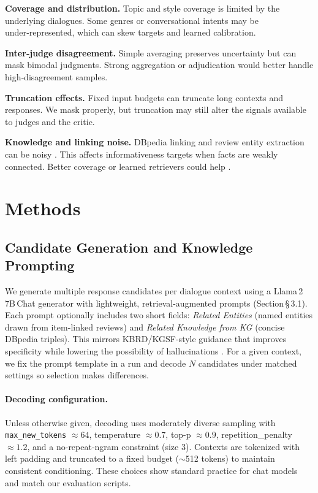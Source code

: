 \documentclass[12pt]{article}
\begin{document}
  \textbf{Coverage and distribution.} Topic and style coverage is limited by the underlying dialogues. Some genres or conversational intents may be under‑represented, which can skew targets and learned calibration.

  \textbf{Inter‑judge disagreement.} Simple averaging preserves uncertainty but can mask bimodal judgments. Strong aggregation or adjudication would better handle high‑disagreement samples.

  \textbf{Truncation effects.} Fixed input budgets can truncate long contexts and responses. We mask properly, but truncation may still alter the signals available to judges and the critic.

  \textbf{Knowledge and linking noise.} DBpedia linking and review entity extraction can be noisy \citep{dbpedia_wikipedia}. This affects informativeness targets when facts are weakly connected. Better coverage or learned retrievers could help \citep{lewis2020rag}.
  
  \section{Methods}
  \subsection{Candidate Generation and Knowledge Prompting}
  We generate multiple response candidates per dialogue context using a Llama\,2\,\textendash\,7B\,Chat generator with lightweight, retrieval-augmented prompts (Section\,\S\,3.1). Each prompt optionally includes two short fields: \emph{Related Entities} (named entities drawn from item-linked reviews) and \emph{Related Knowledge from KG} (concise DBpedia triples). This mirrors KBRD/KGSF-style guidance that improves specificity while lowering the possibility of hallucinations \citep{chen2020kbrd,zhou2020kgsf,lewis2020rag}. For a given context, we fix the prompt template in a run and decode $N$ candidates under matched settings so selection makes differences.
  
  \paragraph{Decoding configuration.} Unless otherwise given, decoding uses moderately diverse sampling with \texttt{max\_new\_tokens} $\approx 64$, temperature $\approx 0.7$, top-p $\approx 0.9$, repetition\_penalty $\approx 1.2$, and a no-repeat-ngram constraint (size 3). Contexts are tokenized with left padding and truncated to a fixed budget (\(\sim\)512 tokens) to maintain consistent conditioning. These choices show standard practice for chat models and match our evaluation scripts.
  
\end{document}
